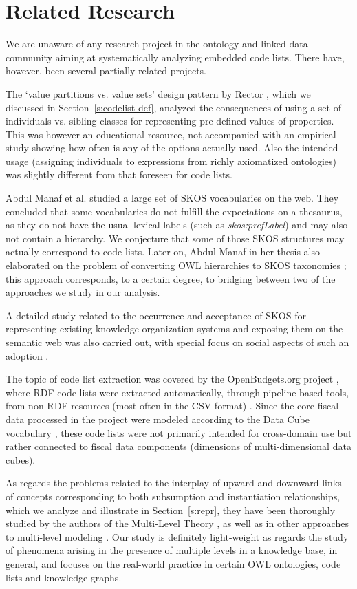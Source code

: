 \section{Related Research}
\label{s:related}
We are unaware of any research project in the ontology and linked data community aiming at systematically analyzing embedded code lists. 
There have, however, been several partially related projects.

The `value partitions vs. value sets' design pattern by Rector \cite{alanrector}, which we discussed in Section~\ref{s:codelist-def}, analyzed the consequences of using a set of individuals vs. sibling classes for representing pre-defined values of properties.
This was however an educational resource, not accompanied with an empirical study showing how often is any of the options actually used.
Also the intended usage (assigning individuals to expressions from richly axiomatized ontologies) was slightly different from that foreseen for code lists.

Abdul Manaf et al. \cite{Yati_eswc12} studied a large set of SKOS vocabularies on the web.
They concluded that some vocabularies do not fulfill the expectations on a thesaurus, as they do not have the usual lexical labels (such as \emph{skos:prefLabel}) and may also not contain a hierarchy.
We conjecture that some of those SKOS structures may actually correspond to code lists.
Later on, Abdul Manaf in her thesis also elaborated on the problem of converting OWL hierarchies to SKOS taxonomies \cite{Yati-thesis}; this approach corresponds, to a certain degree, to bridging between two of the approaches we study in our analysis.

A detailed study related to the occurrence and acceptance of SKOS for representing existing knowledge organization systems and exposing them on the semantic web was also carried out, with special focus on social aspects of such an adoption \cite{DBLP:journals/corr/abs-1801-04479}.


The topic of code list extraction was covered by the OpenBudgets.org project \cite{DBLP:conf/icwe/MusyaffaHLOJAV18}, where RDF code lists were extracted automatically, through pipeline-based tools, from non-RDF resources (most often in the CSV format) \cite{DBLP:conf/smap/FilippidisKKIB16}.
Since the core fiscal data processed in the project were modeled according to the Data Cube vocabulary \cite{data_cube}, these code lists were not primarily intended for cross-domain use but rather connected to fiscal data components (dimensions of multi-dimensional data cubes).

As regards the problems related to the interplay of upward and downward links of concepts corresponding to both subsumption and instantiation relationships, which we analyze and illustrate in Section~\ref{s:repr}, they have been thoroughly studied by the authors of the Multi-Level Theory \cite{conf/er/AlmeidaFC17}, as well as in other approaches to multi-level modeling \cite{journals/dagstuhl-reports/AlmeidaFK17}.
Our study is definitely light-weight as regards the study of phenomena arising in the presence of multiple levels in a knowledge base, in general, and focuses on the real-world practice in certain OWL ontologies, code lists and knowledge graphs.
